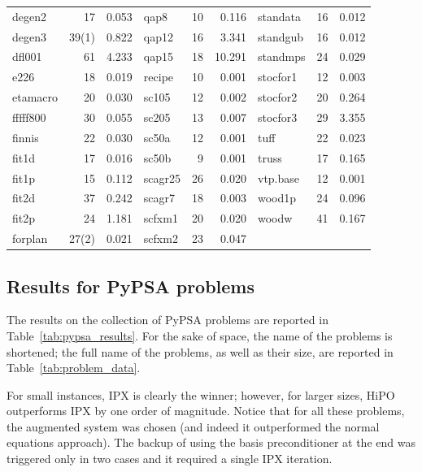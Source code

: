 \documentclass[a4paper]{article}
\newcommand{\0}{\mathbf 0}
\begin{document}
\begin{table}
\begin{tabular}{l|rr||l|rr||l|rr}
degen2 & 17 & 0.053 & qap8 & 10 & 0.116 & standata & 16 & 0.012 \\
degen3 & 39(1) & 0.822 & qap12 & 16 & 3.341 & standgub & 16 & 0.012 \\
dfl001 & 61 & 4.233 & qap15 & 18 & 10.291 & standmps & 24 & 0.029 \\
e226 & 18 & 0.019 & recipe & 10 & 0.001 & stocfor1 & 12 & 0.003 \\
etamacro & 20 & 0.030 & sc105 & 12 & 0.002 & stocfor2 & 20 & 0.264 \\
fffff800 & 30 & 0.055 & sc205 & 13 & 0.007 & stocfor3 & 29 & 3.355 \\
finnis & 22 & 0.030 & sc50a & 12 & 0.001 & tuff & 22 & 0.023 \\
fit1d & 17 & 0.016 & sc50b & 9 & 0.001 & truss & 17 & 0.165 \\
fit1p & 15 & 0.112 & scagr25 & 26 & 0.020 & vtp.base & 12 & 0.001 \\
fit2d & 37 & 0.242 & scagr7 & 18 & 0.003 & wood1p & 24 & 0.096 \\
fit2p & 24 & 1.181 & scfxm1 & 20 & 0.020 & woodw & 41 & 0.167 \\
forplan & 27(2) & 0.021 & scfxm2 & 23 & 0.047 & & & \\
\bottomrule
\end{tabular}
\end{table}

\subsection{Results for PyPSA problems}
The results on the collection of PyPSA problems are reported in Table~\ref{tab:pypsa_results}. For the sake of space, the name of the problems is shortened;  the full name of the problems, as well as their size, are reported in Table~\ref{tab:problem_data}.

For small instances, IPX is clearly the winner; however, for larger sizes, HiPO outperforms IPX by one order of magnitude. Notice that for all these problems, the augmented system was chosen (and indeed it outperformed the normal equations approach).
The backup of using the basis preconditioner at the end was triggered only in two cases and it required a single IPX iteration.
\end{document}
